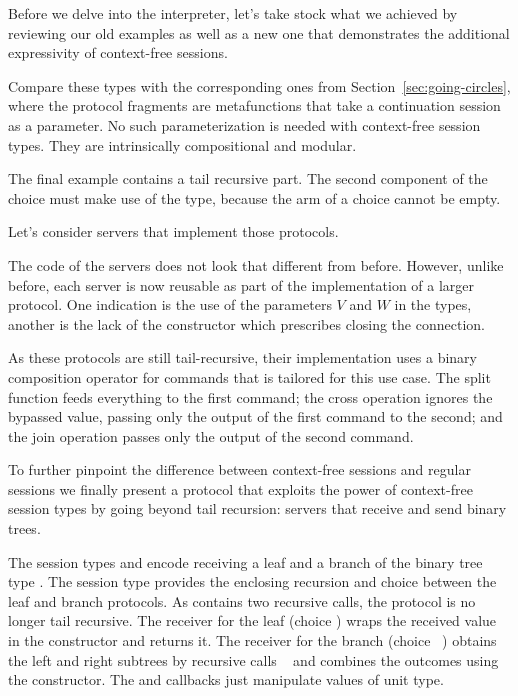 \documentclass[acmsmall,review,anonymous,screen]{acmart}
\begin{document}
Before we delve into the interpreter, let's take stock what we
achieved by reviewing our old examples as well as a new one that
demonstrates the additional expressivity of context-free sessions.
\cstBinaryp

Compare these types with the corresponding ones from
Section~\ref{sec:going-circles}, where the protocol fragments are
metafunctions that take a continuation session as a parameter. No such
parameterization is needed with context-free session types. They are
intrinsically compositional and modular.

The final example {\Amanyunaryp} contains a tail recursive part. The
second component of the choice must make use of the {\Atcfskip} type,
because the arm of a choice cannot be empty.

Let's consider servers that implement those protocols.
\cstCmdExamples

The code of the servers does not look that different from
before. However, unlike before, each server is now reusable as part of
the implementation of a larger protocol. One indication is the use of
the parameters $V$ and $W$ in the types, another is the lack of the
{\ACCLOSE} constructor which prescribes closing the connection.

As these protocols are still tail-recursive, their implementation uses
a binary composition operator for commands that is tailored for this
use case. The split function feeds everything to the first command; the
cross operation ignores the bypassed value, passing only the output of
the first command to the second; and the join operation passes only
the output of the second command.
\cstTailComposition


To further pinpoint the difference between context-free sessions and
regular sessions we finally present a protocol that
exploits the power of context-free session types by going beyond tail
recursion: servers that receive and send binary trees. 
\cstTreep

The session types {\Aleafp} and {\Abranchp} encode receiving a leaf and
a branch of the binary tree type {\AIntTree}. The session type
{\Atreep} provides the enclosing recursion and choice between the leaf
and branch protocols. As {\Abranchp} contains two recursive calls,
the protocol {\Atreep} is no longer tail recursive.
\cstRecvTree
The receiver for the leaf (choice {\Azero}) wraps the received value in the {\ACLeaf}
constructor and returns it.
The receiver for the branch (choice {\Asuc~\Azero}) obtains the left and right subtrees by
recursive calls {\ACONTINUE~\Azero} and combines the outcomes using
the {\ACBranch} constructor. The {\Asplit} and {\Across} callbacks
just manipulate values of unit type.
\end{document}
